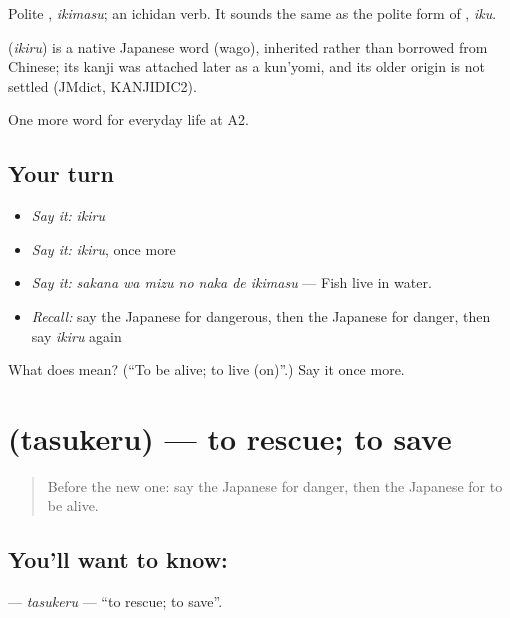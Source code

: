 Polite \textbf{}, \emph{ikimasu}; an ichidan verb. It sounds the same as the polite form of \textbf{}, \emph{iku}.

\begin{cousinweb}
\textbf{} (\emph{ikiru}) is a native Japanese word (wago), inherited rather than borrowed from Chinese; its kanji was attached later as a kun'yomi, and its older origin is not settled (JMdict, KANJIDIC2).
\end{cousinweb}

\begin{grammarlens}[title={What you've built}]
One more word for everyday life at A2.
\end{grammarlens}

\subsection*{Your turn}
\begin{itemize}
\raggedright
  \item \emph{Say it:} \emph{ikiru}
  \item \emph{Say it:} \emph{ikiru}, once more
  \item \emph{Say it:} \emph{sakana wa mizu no naka de ikimasu} — Fish live in water.
  \item \emph{Recall:} say the Japanese for dangerous, then the Japanese for danger, then say \emph{ikiru} again
\end{itemize}

\begin{tcolorbox}[breakable,colback=teal!4,colframe=teal!35!black,title={Before you move on}]
What does  mean? (\textquotedblleft{}To be alive; to live (on)\textquotedblright{}.) Say it once more.
\end{tcolorbox}
\section[\texorpdfstring{\ja{たすける} (tasukeru)}{たすける (tasukeru)}]{ (tasukeru) — to rescue; to save}

\label{lesson:JA-C223-tasukeru}



\begin{quote}
Before the new one: say the Japanese for danger, then the Japanese for to be alive.
\end{quote}

\subsection*{You'll want to know: }
\textbf{} — \emph{tasukeru} — \textquotedblleft{}to rescue; to save\textquotedblright{}.

